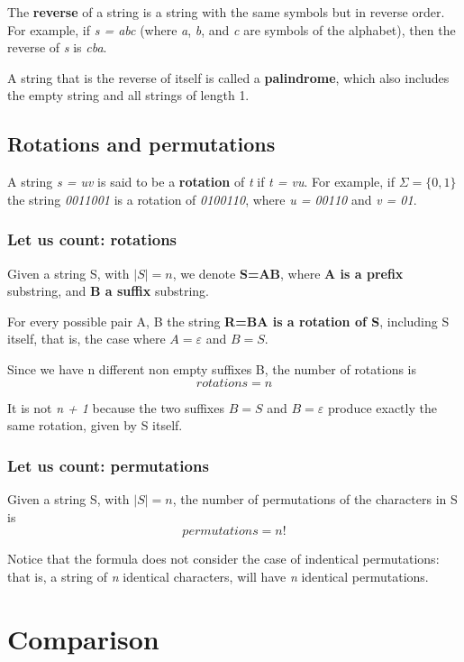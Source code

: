 \documentclass[12pt, letterpaper]{article}
\begin{document}
The \textbf{reverse} of a string is a string with the same symbols but in reverse order. For example, if \emph{s = abc} (where \emph{a}, \emph{b}, and \emph{c} are symbols of the alphabet), then the reverse of \emph{s} is \emph{cba}.

A string that is the reverse of itself is called a \textbf{palindrome}, which also includes the empty string and all strings of length 1.

\subsection{Rotations and permutations}

A string \emph{s = uv} is said to be a \textbf{rotation} of \emph{t} if \emph{t = vu}. For example, if $\Sigma = \{0, 1\}$ the string \emph{0011001} is a rotation of \emph{0100110}, where \emph{u = 00110} and \emph{v = 01}.

\subsubsection{Let us count: rotations}
Given a string S, with $|S| = n$, we denote \textbf{S=AB}, where \textbf{A is a prefix} substring, and \textbf{B a suffix} substring.

For every possible pair A, B the string \textbf{R=BA is a rotation of S}, including S itself, that is, the case where $A=\varepsilon$ and $B=S$.

Since we have n different non empty suffixes B, the number of rotations is
$$
rotations = n
$$

It is not \emph{n + 1} because the two suffixes $B=S$ and $B=\varepsilon$ produce exactly the same rotation, given by S itself.

\subsubsection{Let us count: permutations}

Given a string S, with $|S| = n$, the number of permutations of the characters in S is
$$
permutations = n!
$$

Notice that the formula does not consider the case of indentical permutations: that is, a string of \emph{n} identical characters, will have \emph{n} identical permutations.

\section{Comparison}
\end{document}
